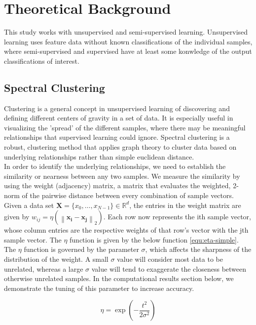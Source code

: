 \documentclass[11pt]{amsart}
\begin{document}
\section{Theoretical Background}\label{sec:Theory}

This study works with unsupervised and semi-supervised learning. Unsupervised learning uses feature data 
without known classifications of the individual samples, where semi-supervised and supervised have at least 
some konwledge of the output classifications of interest.\\

\subsection{Spectral Clustering}\label{sec:Spectral-clustering}

Clustering is a general concept in unsupervised learning of discovering and defining different centers of gravity 
in a set of data. It is especially useful in visualizing the 'spread' of the different samples, where there may be 
meaningful relationships that supervised learning could ignore. Spectral clustering is a robust, clustering method 
that applies graph theory to cluster data based on underlying relationships rather than simple euclidean distance\cite{databook}.\\

In order to identify the underlying relationships, we need to establish the similarity or nearness between any two samples. 
We measure the similarity by using the weight (adjacency) matrix, a matrix that evaluates the weighted, 2-norm of the pairwise distance between 
every combination of sample vectors. Given a data set $\mathbf{X} = \{x_0, \dots, x_{N-1}\} \in \mathbb{R}^d$, the 
entries in the weight matrix are given by $w_{ij} = \eta(\left\| \mathbf{x_i} - \mathbf{x_j}\right\|_2)$. Each row now 
represents the ith sample vector, whose column entries are the respective weights of that row's vector with the jth sample vector. 
The $\eta$ function is given by the below function \eqref{equ:eta-simple}. The $\eta$ function is governed by the parameter 
$\sigma$, which affects the sharpness of the distribution of the weight. A small $\sigma$ value will consider most data to be unrelated, 
whereas a large $\sigma$ value will tend to exaggerate the closeness between otherwise unrelated samples. In the computational results 
section below, we demonstrate the tuning of this parameter to increase accuracy. 

\begin{equation}
    \eta = \exp \left( -\frac{t^2}{2\sigma^2} \right)
    \label{equ:eta-simple}
\end{equation}
\end{document}
